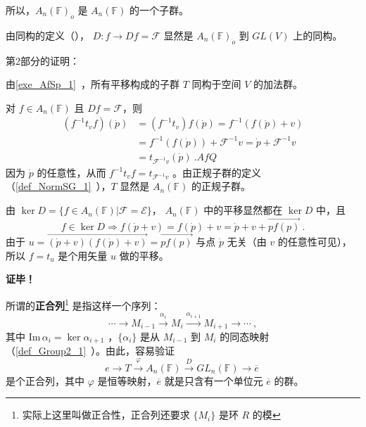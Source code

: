 所以，$A_n(\mathbb F)_{\dot o}$ 是 $A_n(\mathbb F)$ 的一个子群。

由同构的定义（）， $D:f\rightarrow Df=\mathcal F$ 显然是 $A_n(\mathbb F)_{\dot o}$ 到 $GL(V)$ 上的同构。

第2部分的证明：

由\autoref{exe_AfSp_1}~，所有平移构成的子群 $T$ 同构于空间 $V$ 的加法群。
 
对 $f\in A_n(\mathbb F)$ 且 $Df=\mathcal F$，则
\begin{equation}
\begin{aligned}
(f^{-1}t_vf)(\dot p)&=(f^{-1}t_v)f(\dot p)=f^{-1}(f(\dot p)+v)\\
&=f^{-1}(f(\dot p))+\mathcal F^{-1}v=\dot p+\mathcal F^{-1}v\\
&=t_{\mathcal F^{-1}v}(\dot p)~.AfQ
\end{aligned}
\end{equation}
因为 $\dot p$ 的任意性，从而 $f^{-1}t_vf=t_{\mathcal F^{-1}v}$ 。由正规子群的定义（\autoref{def_NormSG_1}~），$T$ 显然是 $A_n(\mathbb F)$ 的正规子群。

由 $\ker D=\{f\in A_n(\mathbb F)|\mathcal F=\mathcal E\}$， $A_n(\mathbb F)$ 中的平移显然都在 $\ker D$ 中，且
\begin{equation}
f\in \ker D\Rightarrow f(\dot p+v)=f(\dot p)+v=\dot p+v+\overrightarrow{pf(p)}~.
\end{equation}
由于 $u=\overrightarrow{(\dot p+v)(f(\dot p)+v)}=\overrightarrow{pf(p)}$ 与点 $\dot p$ 无关（由 $v$ 的任意性可见），所以 $f=t_u$ 是个用矢量 $u$ 做的平移。

\textbf{证毕！}

所谓的\textbf{正合列}\footnote{实际上这里叫做正合性，正合列还要求 $\{M_i\}$ 是环 $R$ 的模} 是指这样一个序列：
\begin{equation}
\cdots\rightarrow M_{i-1}\xrightarrow{\alpha_i} M_{i}\xrightarrow{\alpha_{i+1}}M_{i+1}\rightarrow\cdots~,
\end{equation}
其中 $\mathrm{Im}\,\alpha_{i}=\ker\alpha_{i+1}$ ，$\{\alpha_i\}$ 是从 $M_{i-1}$ 到 $M_i$ 的同态映射（\autoref{def_Group2_1}~）。由此，容易验证
\begin{equation}
e\rightarrow T\xrightarrow{\varphi}A_n(\mathbb F)\xrightarrow{D} GL_n(\mathbb F)\rightarrow \overline{e}~
\end{equation}
是个正合列，其中 $\varphi$ 是恒等映射，$\overline{e}$ 就是只含有一个单位元 $\overline{e}$ 的群。 